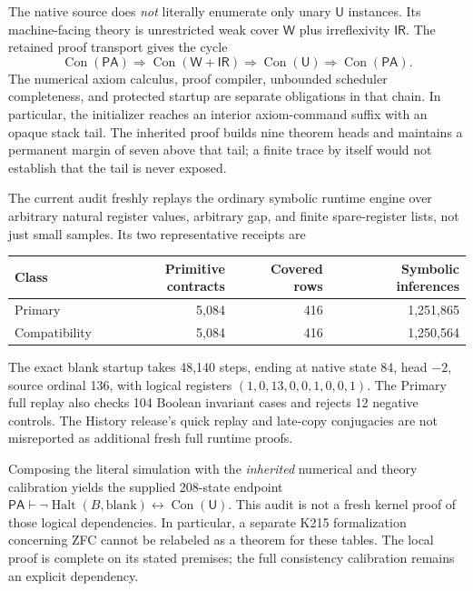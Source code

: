 \documentclass[11pt,letterpaper]{article}
\newcommand{\PA}{\mathsf{PA}}\newcommand{\Con}{\operatorname{Con}}\newcommand{\Halt}{\operatorname{Halt}}\newcommand{\UU}{\mathsf U}
\begin{document}
The native source does \emph{not} literally enumerate only unary $\UU$
instances. Its machine-facing theory is unrestricted weak cover $\mathsf W$
plus irreflexivity $\mathsf{IR}$. The retained proof transport gives the cycle
\[
 \Con(\PA)\Longrightarrow\Con(\mathsf W+\mathsf{IR})
 \Longrightarrow\Con(\UU)\Longrightarrow\Con(\PA).
\]
The numerical axiom calculus, proof compiler, unbounded scheduler completeness,
and protected startup are separate obligations in that chain. In particular,
the initializer reaches an interior axiom-command suffix with an opaque stack
tail. The inherited proof builds nine theorem heads and maintains a permanent
margin of seven above that tail; a finite trace by itself would not establish
that the tail is never exposed.

The current audit freshly replays the ordinary symbolic runtime engine over
arbitrary natural register values, arbitrary gap, and finite spare-register
lists, not just small samples. Its two representative receipts are
\begin{center}\begin{tabular}{lrrr}\toprule
Class & Primitive contracts & Covered rows & Symbolic inferences\\\midrule
Primary & 5,084 & 416 & 1,251,865\\
Compatibility & 5,084 & 416 & 1,250,564\\\bottomrule
\end{tabular}\end{center}
The exact blank startup takes 48,140 steps, ending at native state 84, head
$-2$, source ordinal 136, with logical registers $(1,0,13,0,0,1,0,0,1)$.
The Primary full replay also checks 104 Boolean invariant cases and rejects
12 negative controls. The History release's quick replay and late-copy
conjugacies are not misreported as additional fresh full runtime proofs.

Composing the literal simulation with the \emph{inherited} numerical and theory
calibration yields the supplied 208-state endpoint
$\PA\vdash\neg\Halt(B,\mathrm{blank})\leftrightarrow\Con(\UU)$.
This audit is not a fresh kernel proof of those logical dependencies. In
particular, a separate K215 formalization concerning ZFC cannot be relabeled
as a theorem for these tables. The local proof is complete on its stated
premises; the full consistency calibration remains an explicit dependency.

\clearpage
\end{document}
